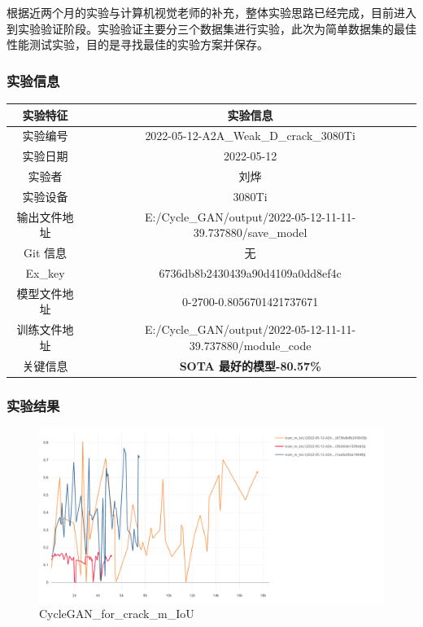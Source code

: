 根据近两个月的实验与计算机视觉老师的补充，整体实验思路已经完成，目前进入到实验验证阶段。实验验证主要分三个数据集进行实验，此次为简单数据集的最佳性能测试实验，目的是寻找最佳的实验方案并保存。

\subsubsection{实验信息}


\begin{table}[H]
	\centering
	\begin{spacing}{1.5}
		\begin{tabular}{cc}\hline
			实验特征 & 实验信息 \\
			\hline
			实验编号 & 2022-05-12-A2A\_Weak\_D\_crack\_3080Ti \\
			实验日期 &  2022-05-12\\
			实验者 & 刘烨\\
			实验设备& 3080Ti\\
			输出文件地址 & E:/Cycle\_GAN/output/2022-05-12-11-11-39.737880/save\_model\\
			Git 信息 & 无\\
			Ex\_key & 6736db8b2430439a90d4109a0dd8ef4c\\
			模型文件地址 & 0-2700-0.8056701421737671\\
			训练文件地址 & E:/Cycle\_GAN/output/2022-05-12-11-11-39.737880/module\_code\\
			关键信息 & \textbf{SOTA 最好的模型-80.57\%}\\
			\hline
		\end{tabular}
	\end{spacing}
\end{table}


\subsubsection{实验结果}

\begin{figure}[h]
	\centering
	\includegraphics[width=360pt,height=160pt]{0512//1}
	\caption{CycleGAN\_for\_crack\_m\_IoU}
\end{figure}


